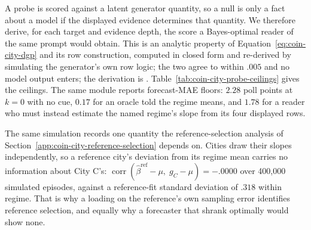 A probe is scored against a latent generator quantity, so a null is only a fact
about a model if the displayed evidence determines that quantity. We therefore
derive, for each target and evidence depth, the score a Bayes-optimal reader of
the same prompt would obtain. This is an analytic property of
Equation~\ref{eq:coin-city-dgp} and its row construction, computed in closed form
and re-derived by simulating the generator's own row logic; the two agree to
within $.005$ and no model output enters; the derivation is
.
Table~\ref{tab:coin-city-probe-ceilings} gives the ceilings. The same module
reports forecast-MAE floors: $2.28$ poll points at $k=0$ with no cue, $0.17$ for
an oracle told the regime means, and $1.78$ for a reader who must instead estimate
the named regime's slope from its four displayed rows.

The same simulation records one quantity the reference-selection analysis of
Section~\ref{app:coin-city-reference-selection} depends on. Cities draw their
slopes independently, so a reference city's deviation from its regime mean
carries no information about City C's:
$\operatorname{corr}(\widehat\beta^{\mathrm{ref}}-\mu,\;g_C-\mu)=-.0000$ over
400,000 simulated episodes, against a reference-fit standard deviation of $.318$
within regime. That is why a loading on the reference's own sampling error
identifies reference selection, and equally why a forecaster that shrank
optimally would show none.

\begin{center}
\begin{minipage}{\linewidth}
\centering
{}
\label{tab:coin-city-probe-ceilings}
\small

\end{minipage}
\end{center}


